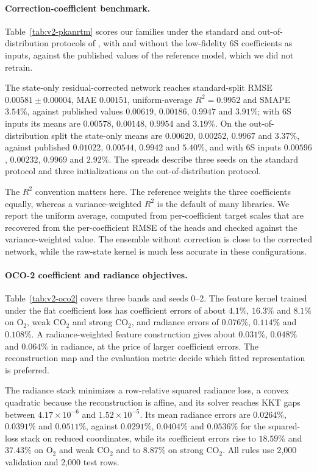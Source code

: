 \paragraph{Correction-coefficient benchmark.}
Table~\ref{tab:v2-pkanrtm} scores our families under the standard and out-of-distribution
protocols of \cite{pkan}, with and without the low-fidelity 6S coefficients as inputs, against the
published values of the reference model, which we did not retrain.

The state-only residual-corrected network reaches standard-split RMSE $0.00581\pm0.00004$, MAE
$0.00151$, uniform-average $R^2=0.9952$ and SMAPE $3.54\%$, against published values $0.00619$,
$0.00186$, $0.9947$ and $3.91\%$; with 6S inputs its means are $0.00578$, $0.00148$, $0.9954$ and
$3.19\%$. On the out-of-distribution split the state-only means are $0.00620$, $0.00252$, $0.9967$
and $3.37\%$, against published $0.01022$, $0.00544$, $0.9942$ and $5.40\%$, and with 6S inputs
$0.00596$, $0.00232$, $0.9969$ and $2.92\%$. The spreads describe three seeds on the standard
protocol and three initializations on the out-of-distribution protocol.

The $R^2$ convention matters here. The reference weights the three coefficients equally, whereas a
variance-weighted $R^2$ is the default of many libraries. We report the uniform average, computed
from per-coefficient target scales that are recovered from the per-coefficient RMSE of the heads
and checked against the variance-weighted value. The ensemble without correction is close to the
corrected network, while the raw-state kernel is much less accurate in these configurations.

\paragraph{OCO-2 coefficient and radiance objectives.}
Table~\ref{tab:v2-oco2} covers three bands and seeds 0--2. The feature kernel trained under the
flat coefficient loss has coefficient errors of about $4.1\%$, $16.3\%$ and $8.1\%$ on O$_2$, weak
CO$_2$ and strong CO$_2$, and radiance errors of $0.076\%$, $0.114\%$ and $0.108\%$. A
radiance-weighted feature construction gives about $0.031\%$, $0.048\%$ and $0.064\%$ in radiance,
at the price of larger coefficient errors. The reconstruction map and the evaluation metric decide
which fitted representation is preferred.

The radiance stack minimizes a row-relative squared radiance loss, a convex quadratic because the
reconstruction is affine, and its solver reaches KKT gaps between $4.17\times10^{-6}$ and
$1.52\times10^{-5}$. Its mean radiance errors are $0.0264\%$, $0.0391\%$ and $0.0511\%$, against
$0.0291\%$, $0.0404\%$ and $0.0536\%$ for the squared-loss stack on reduced coordinates, while its
coefficient errors rise to $18.59\%$ and $37.43\%$ on O$_2$ and weak CO$_2$ and to $8.87\%$ on
strong CO$_2$. All rules use 2{,}000 validation and 2{,}000 test rows.

